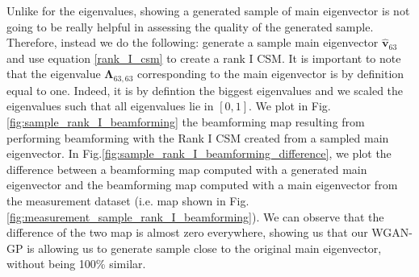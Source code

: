 \documentclass{article}
\begin{document}
Unlike for the eigenvalues, showing a generated sample of main eigenvector is not going to be really helpful in assessing the quality of the generated sample. Therefore, instead we do the following: generate a sample main eigenvector $\hat{\mathbf{v}}_{63}$ and use equation \ref{rank_I_csm} to create a rank I CSM. It is important to note that the eigenvalue $\mathbf{\Lambda}_{63, 63}$ corresponding to the main eigenvector is by definition equal to one. Indeed, it is by defintion the biggest eigenvalues and we scaled the eigenvalues such that all eigenvalues lie in $[0,1]$. We plot in Fig.\ref{fig:sample_rank_I_beamforming} the beamforming map resulting from performing beamforming with the Rank I CSM created from a sampled main eigenvector. In Fig.\ref{fig:sample_rank_I_beamforming_difference}, we plot the difference between a beamforming map computed with a generated main eigenvector and the beamforming map computed with a main eigenvector from the measurement dataset (i.e. map shown in Fig.\ref{fig:measurement_sample_rank_I_beamforming}). We can observe that the difference of the two map is almost zero everywhere, showing us that our WGAN-GP is allowing us to generate sample close to the original main eigenvector, without being 100\% similar. 
\end{document}
